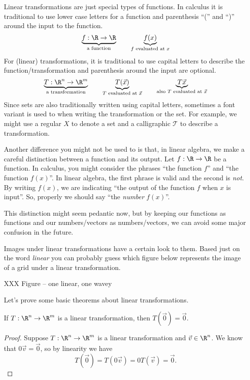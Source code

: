 Linear transformations are just special types of functions. In calculus it is traditional to use lower case
letters for a function and parenthesis ``('' and ``)'' around the input to the function.
\[
	\underbrace{f:\R\to\R}_{\text{a function}}\qquad \underbrace{f(x)}_{\text{$f$ evaluated at $x$}}
\]
For (linear) transformations, it is traditional to use capital letters to describe the function/transformation
and parenthesis around the input are optional.
\[
	\underbrace{T:\R^n\to\R^m}_{\text{a transformation}}\qquad \underbrace{T(\vec x)}_{\text{$T$ evaluated at $\vec x$}}
	\qquad
	\underbrace{T\vec x}_{\text{also $T$ evaluated at $\vec x$}}
\]
Since sets are also traditionally written using capital letters, sometimes a font variant is used to when writing the transformation
or the set. For example, we might use a regular $X$ to denote a set and a calligraphic $\mathcal T$ to describe a transformation.

\bigskip

Another difference you might not be used to is that, in linear algebra, we make a careful distinction between
a function and its output. Let $f:\R\to\R$ be a function. In calculus, you might consider the phrases ``the function $f$''
and ``the function $f(x)$''. In linear algebra, the first phrase is valid and the second is \emph{not}. By writing
$f(x)$, we are indicating ``the output of the function $f$ when $x$ is input''. So, properly we should say ``the \emph{number} $f(x)$''.

This distinction might seem pedantic now, but by keeping our functions as functions and our numbers/vectors as numbers/vectors,
we can avoid some major confusion in the future.



Images under linear transformations have a certain look to them. Based just on the word
\emph{linear} you can probably guess which figure below represents the image of a grid under
a linear transformation.

XXX Figure -- one linear, one wavey

Let's prove some basic theorems about linear transformations.

\begin{theorem}
	If $T:\R^n\to\R^m$ is a linear transformation, then $T(\vec 0)=\vec 0$.
\end{theorem}
\begin{proof}
	Suppose $T:\R^n\to\R^m$ is a linear transformation and $\vec v\in \R^n$. We know
	that $0\vec v=\vec 0$, so by linearity we have
	\[
		T(\vec 0)=T(0\vec v)=0T(\vec v)=\vec 0.
	\]
\end{proof}

